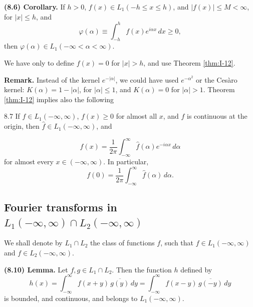 \noindent\textbf{(8.6) Corollary.}
If $h>0$, $f(x)\in L_1(-h\le x\le h)$, and $|f(x)|\le M<\infty$, for $|x|\le h$, and
\begin{equation*}
\varphi(\alpha)\equiv\int_{-h}^{h}f(x)e^{i\alpha x}\,dx\ge 0,
\end{equation*}
then $\varphi(\alpha)\in L_1(-\infty<\alpha<\infty)$.

We have only to define $f(x)=0$ for $|x|>h$, and use Theorem \ref{thm:I-12}.

\noindent\textbf{Remark.}
Instead of the kernel $e^{-|\alpha|}$, we could have used $e^{-\alpha^{2}}$ or the Ces\`aro kernel: $K(\alpha)=1-|\alpha|$, for $|\alpha|\le 1$, and $K(\alpha)=0$ for $|\alpha|>1$. Theorem \ref{thm:I-12} implies also the following

\begin{nstmt}{8.7}\label{eq:I-8.7}
If $f\in L_1(-\infty,\infty)$, $f(x)\ge 0$ for almost all $x$, and $f$ is continuous at the origin, then $\widehat f\in L_1(-\infty,\infty)$, and
\end{nstmt}
\begin{equation}\label{eq:I-8.8}\tag{8.8}
f(x)=\frac{1}{2\pi}\int_{-\infty}^{\infty}\widehat f(\alpha)e^{-i\alpha x}\,d\alpha
\end{equation}
for almost every $x\in(-\infty,\infty)$. In particular,
\begin{equation}\label{eq:I-8.9}\tag{8.9}
f(0)=\frac{1}{2\pi}\int_{-\infty}^{\infty}\widehat f(\alpha)\,d\alpha.
\end{equation}

\subsection*{Fourier transforms in $L_1(-\infty,\infty)\cap L_2(-\infty,\infty)$}
We shall denote by $L_1\cap L_2$ the class of functions $f$, such that $f\in L_1(-\infty,\infty)$ and $f\in L_2(-\infty,\infty)$.

\noindent\textbf{(8.10) Lemma.}
Let $f,g\in L_1\cap L_2$. Then the function $h$ defined by
\begin{equation}\label{eq:I-8.11}\tag{8.11}
h(x)=\int_{-\infty}^{\infty}f(x+y)\,\overline{g(y)}\,dy
=\int_{-\infty}^{\infty}f(x-y)\,\overline{g(-y)}\,dy
\end{equation}
is bounded, and continuous, and belongs to $L_1(-\infty,\infty)$.

